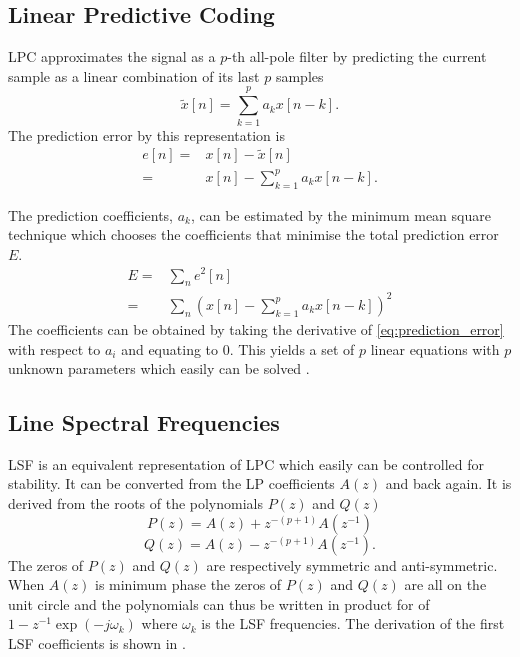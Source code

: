 \subsection{Linear Predictive Coding} %
\label{sub:lpc}
LPC approximates the signal as a $p$-th all-pole filter by predicting the current sample as a linear combination of its last $p$ samples \cite{digsig}
\begin{equation}
	\tilde{x}[n] = \sum_{k=1}^{p}a_k x[n-k].
\end{equation}
The prediction error by this representation is 
\begin{equation}
	\begin{split}
		e[n]= & x[n]-\tilde{x}[n]\\
		= & x[n]-\sum_{k=1}^{p}a_k x[n-k].
	\end{split}
\end{equation}

The prediction coefficients, $a_k$, can be estimated by the minimum mean square technique which chooses the coefficients that minimise the total prediction error $E$.
\begin{equation}
	\label{eq:prediction_error}
	\begin{split}
		E = & \sum_{n}e^2[n]\\
		= & \sum_{n}\left( x[n]-\sum_{k=1}^{p}a_k x[n-k] \right)^2
	\end{split}
\end{equation}
The coefficients can be obtained by taking the derivative of \eqref{eq:prediction_error} with respect to $a_i$ and equating to 0. This yields a set of $p$ linear equations with $p$ unknown parameters which easily can be solved \cite{digsig}.

\subsection{Line Spectral Frequencies} %
\label{sub:line_spectral_frequencies}
LSF is an equivalent representation of LPC which easily can be controlled for stability. It can be converted from the LP coefficients $A(z)$ and back again. It is derived from the roots of the polynomials $P(z)$ and $Q(z)$ 
\begin{equation}
	\label{eq:p_z}
	P(z) = A(z)+z^{-(p+1)}A(z^{-1})
\end{equation}
\begin{equation}
	\label{eq:q_z}
	Q(z) = A(z)-z^{-(p+1)}A(z^{-1}).
\end{equation}
The zeros of $P(z)$ and $Q(z)$ are respectively symmetric and anti-symmetric. When $A(z)$ is minimum phase the zeros of $P(z)$ and $Q(z)$ are all on the unit circle and the polynomials can thus be written in product for of
$1-z^{-1}\exp(-j\omega_k)$ where $\omega_k$ is the LSF frequencies. The derivation of the first LSF coefficients is shown in \cite[p. 304]{taletek}.

